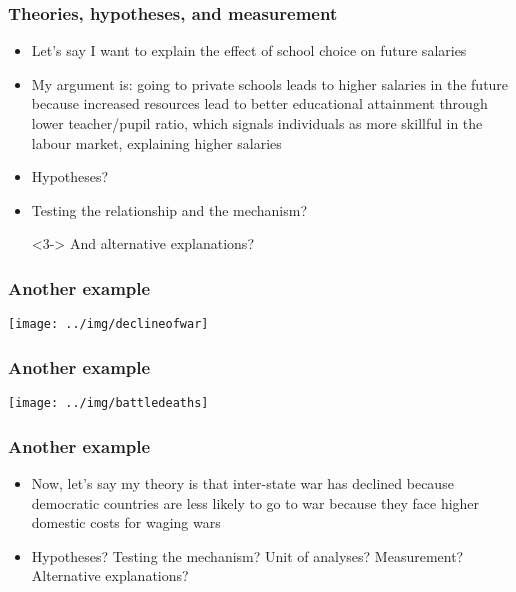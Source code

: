 \documentclass[aspectratio=43]{beamer}
\begin{document}

\begin{frame}
\frametitle{Theories, hypotheses, and measurement}
\centering

\begin{itemize}
  \item Let's say I want to explain the effect of school choice on future salaries
  \item My argument is: going to private schools leads to higher salaries in the future because increased resources lead to better educational attainment through lower teacher/pupil ratio, which signals individuals as more skillful in the labour market, explaining higher salaries
  \item[]
  \item<2-> Hypotheses?
  \item<3-> Testing the relationship and the mechanism?
  \item[]<3-> And alternative explanations?
\end{itemize}

\end{frame}

\begin{frame}
\frametitle{Another example}
\centering

\texttt{[image: ../img/declineofwar]}

\end{frame}

\begin{frame}
\frametitle{Another example}
\centering

\texttt{[image: ../img/battledeaths]}

\end{frame}

\begin{frame}
\frametitle{Another example}
\centering

\begin{itemize}
  \item Now, let's say my theory is that inter-state war has declined because democratic countries are less likely to go to war because they face higher domestic costs for waging wars
  \item[]
  \item Hypotheses? Testing the mechanism? Unit of analyses? Measurement? Alternative explanations?
\end{itemize}

\end{frame}
\end{document}
